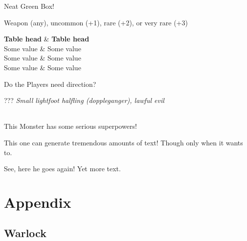 \documentclass[10pt,twoside,twocolumn,openany]{book}
\begin{document}
\newpage

\begin{commentbox}{Neat Green Box!}
	\lipsum[1]
\end{commentbox}

{Weapon (any), uncommon (+1), rare (+2), or very rare (+3)}

\newpage %

\begin{dndtable}
	   \textbf{Table head}  & \textbf{Table head} \\
	   Some value  & Some value \\
	   Some value  & Some value \\
	   Some value  & Some value
\end{dndtable}

\begin{paperbox}{Do the Players need direction?}
	\lipsum[1]
\end{paperbox}

\begin{monsterbox}{???}
	\textit{Small lightfoot halfling (doppleganger), lawful evil}\\
	\hline
	\basics[%
	armorclass = 13,
	hitpoints  = 13,
	speed      = 20 ft
	]
	\hline
	\stats[
	STR = \stat{12}, %
	DEX = \stat{14},
	CON = \stat{10},
	INT = \stat{13},
	WIS = \stat{12},
	CHA = \stat{20}
	]
	\hline
	\details[%
	senses = {Darkvision 60 ft},
	languages = {Common, Erlang},
	conditionimmunities = {Charmed},
	]
	\hline \\[1mm]
	\begin{monsteraction}
		This Monster has some serious superpowers!
	\end{monsteraction}
	\begin{monsteraction}
		This one can generate tremendous amounts of text! Though only when it wants to.
	\end{monsteraction}

	\begin{monsteraction}
	See, here he goes again! Yet more text.
	\end{monsteraction}
\end{monsterbox}

\clearpage

\chapter{Appendix}



\section{Warlock}


\end{document}
